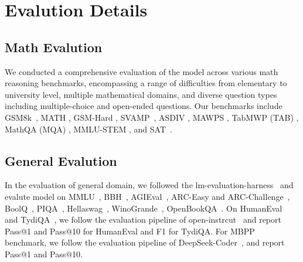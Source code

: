 \section{Evalution Details}
\label{sec:appendix:evalution}


\subsection{Math Evalution}
\label{sec:appendix:math_evalution}
We conducted a comprehensive evaluation of the model across various math reasoning benchmarks, encompassing a range of difficulties from elementary to university level, multiple mathematical domains, and diverse question types including multiple-choice and open-ended questions.
Our benchmarks include GSM8k~\citep{cobbe2021gsm8k}, MATH \citep{hendrycks2021measuring}, GSM-Hard \citep{gao2022pal}, SVAMP~\citep{patel2021svamp}, ASDIV \citep{miao-etal-2020-diverse},  MAWPS \citep{koncel-kedziorski-etal-2016-mawps}, TabMWP (TAB) \citep{lu2023dynamic}, MathQA (MQA) \citep{amini2019mathqa}, MMLU-STEM \citep{hendrycks2020measuring}, and SAT~\citep{azerbayev2023llemma}.


\subsection{General Evalution}
\label{sec:appendix:general_evalution}
In the evaluation of general domain, we followed the lm-evaluation-harness~\citep{eval-harness} and evalute model on MMLU~\citep{hendrycks2020measuring}, BBH~\citep{suzgun2022challenging}, AGIEval~\citep{zhong2023agieval}, ARC-Easy and ARC-Challenge~\citep{clark2018arc}, BoolQ~\citep{clark2019boolq}, PIQA~\citep{bisk2020piqa}, Hellaswag~\citep{zellers2019hellaswag}, WinoGrande~\citep{sakaguchi2021winogrande}, OpenBookQA~\citep{mihaylov2018obqa}. 
On HumanEval~\citep{zheng2023codegeex} and TydiQA~\citep{clark2020tydiqa}, we follow the evaluation pipeline of open-instrcut~\citep{ivison2023camels} and report {Pass@1} and {Pass@10} for HumanEval and {F1} for TydiQA. For MBPP~\citep{austin2021mbpp} benchmark, we follow the evaluation pipeline of DeepSeek-Coder~\citep{deepseek-coder}, and report {Pass@1} and {Pass@10}.

